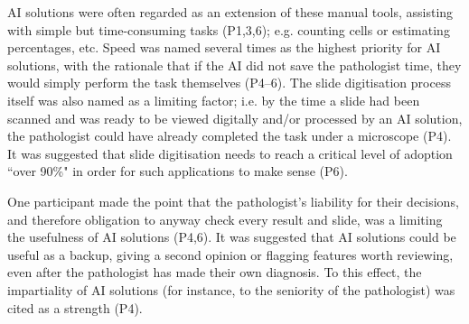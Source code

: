 
AI solutions were often regarded as an extension of these manual tools, assisting with simple but time-consuming tasks (P1,3,6); e.g. counting cells or estimating percentages, etc. Speed was named several times as the highest priority for AI solutions, with the rationale that if the AI did not save the pathologist time, they would simply perform the task themselves (P4--6). The slide digitisation process itself was also named as a limiting factor; i.e. by the time a slide had been scanned and was ready to be viewed digitally and/or processed by an AI solution, the pathologist could have already completed the task under a microscope (P4). It was suggested that slide digitisation needs to reach a critical level of adoption ``over 90\%" in order for such applications to make sense (P6).


One participant made the point that the pathologist's liability for their decisions, and therefore obligation to anyway check every result and slide, was a limiting the usefulness of AI solutions (P4,6). It was suggested that AI solutions could be useful as a backup, giving a second opinion or flagging features worth reviewing, even after the pathologist has made their own diagnosis. To this effect, the impartiality of AI solutions (for instance, to the seniority of the pathologist) was cited as a strength (P4).


